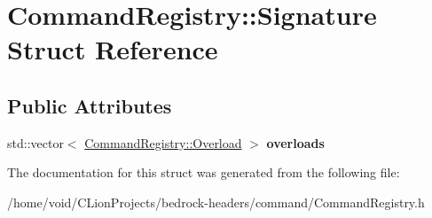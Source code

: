 \hypertarget{struct_command_registry_1_1_signature}{}\section{Command\+Registry\+::Signature Struct Reference}
\label{struct_command_registry_1_1_signature}
\subsection*{Public Attributes}
\begin{DoxyCompactItemize}
\item 
\mbox{\label{struct_command_registry_1_1_signature_a61ab0927f399c265ea8ad21f5c12cd80}} 
std\+::vector$<$ \mbox{\hyperlink{struct_command_registry_1_1_overload}{Command\+Registry\+::\+Overload}} $>$ {\bfseries overloads}
\end{DoxyCompactItemize}


The documentation for this struct was generated from the following file\+:\begin{DoxyCompactItemize}
\item 
/home/void/\+C\+Lion\+Projects/bedrock-\/headers/command/Command\+Registry.\+h\end{DoxyCompactItemize}
